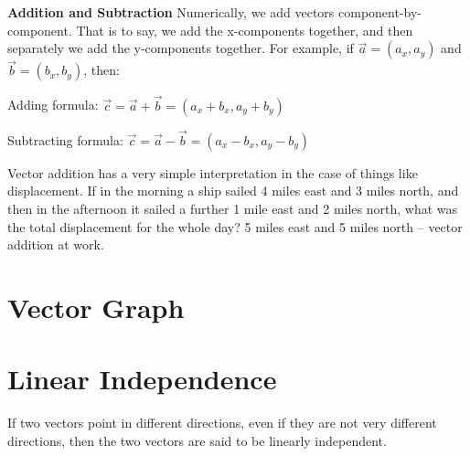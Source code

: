\documentclass{article}
\begin{document}
\textbf{Addition and Subtraction} 
Numerically, we add vectors component-by-component. That is to say, we add the x-components together, and then separately we add the y-components together. For example, if $\vec{a} = (a_x, a_y)$ and $\vec{b} = (b_x, b_y)$, then:

Adding formula: $\vec{c} = \vec{a} + \vec{b} = (a_x + b_x, a_y + b_y)$

Subtracting formula: $\vec{c} = \vec{a} - \vec{b} = (a_x - b_x, a_y - b_y)$

Vector addition has a very simple interpretation in the case of things like displacement. If in the morning a ship sailed 4 miles east and 3 miles north, and then in the afternoon it sailed a further 1 mile east and 2 miles north, what was the total displacement for the whole day? 5 miles east and 5 miles north – vector addition at work.
\section{Vector Graph}

\section{Linear Independence}
If two vectors point in different directions, even if they are not very different directions, then the two vectors are said to be linearly independent.
\end{document}
